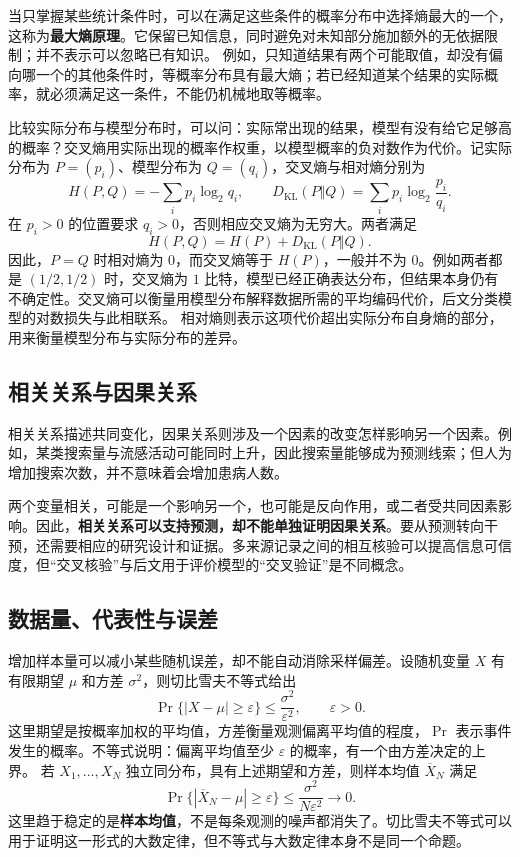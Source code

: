 \documentclass[UTF8,fontset=fandol,a4paper,12pt]{ctexart}
\theoremstyle{definition}
\begin{document}
当只掌握某些统计条件时，可以在满足这些条件的概率分布中选择熵最大的一个，这称为\textbf{最大熵原理}。它保留已知信息，同时避免对未知部分施加额外的无依据限制；并不表示可以忽略已有知识。
例如，只知道结果有两个可能取值，却没有偏向哪一个的其他条件时，等概率分布具有最大熵；若已经知道某个结果的实际概率，就必须满足这一条件，不能仍机械地取等概率。

比较实际分布与模型分布时，可以问：实际常出现的结果，模型有没有给它足够高的概率？交叉熵用实际出现的概率作权重，以模型概率的负对数作为代价。记实际分布为 $P=(p_i)$、模型分布为 $Q=(q_i)$，交叉熵与相对熵分别为
\[
 H(P,Q)=-\sum_i p_i\log_2 q_i,\qquad
 D_{\mathrm{KL}}(P\Vert Q)=\sum_i p_i\log_2\frac{p_i}{q_i}.
\]
在 $p_i>0$ 的位置要求 $q_i>0$，否则相应交叉熵为无穷大。两者满足
\[
 \boxed{H(P,Q)=H(P)+D_{\mathrm{KL}}(P\Vert Q).}
\]
因此，$P=Q$ 时相对熵为 $0$，而交叉熵等于 $H(P)$，一般并不为 $0$。例如两者都是 $(1/2,1/2)$ 时，交叉熵为 $1$ 比特，模型已经正确表达分布，但结果本身仍有不确定性。交叉熵可以衡量用模型分布解释数据所需的平均编码代价，后文分类模型的对数损失与此相联系。
相对熵则表示这项代价超出实际分布自身熵的部分，用来衡量模型分布与实际分布的差异。

\subsection{相关关系与因果关系}
相关关系描述共同变化，因果关系则涉及一个因素的改变怎样影响另一个因素。例如，某类搜索量与流感活动可能同时上升，因此搜索量能够成为预测线索；但人为增加搜索次数，并不意味着会增加患病人数。

两个变量相关，可能是一个影响另一个，也可能是反向作用，或二者受共同因素影响。因此，\textbf{相关关系可以支持预测，却不能单独证明因果关系}。要从预测转向干预，还需要相应的研究设计和证据。多来源记录之间的相互核验可以提高信息可信度，但“交叉核验”与后文用于评价模型的“交叉验证”是不同概念。

\subsection{数据量、代表性与误差}
增加样本量可以减小某些随机误差，却不能自动消除采样偏差。设随机变量 $X$ 有有限期望 $\mu$ 和方差 $\sigma^2$，则切比雪夫不等式给出
\[
 \Pr\{|X-\mu|\ge\varepsilon\}\le\frac{\sigma^2}{\varepsilon^2},
 \qquad\varepsilon>0.
\]
这里期望是按概率加权的平均值，方差衡量观测偏离平均值的程度，$\Pr$ 表示事件发生的概率。不等式说明：偏离平均值至少 $\varepsilon$ 的概率，有一个由方差决定的上界。
若 $X_1,\ldots,X_N$ 独立同分布，具有上述期望和方差，则样本均值 $\overline X_N$ 满足
\[
 \Pr\{|\overline X_N-\mu|\ge\varepsilon\}
 \le\frac{\sigma^2}{N\varepsilon^2}\longrightarrow0.
\]
这里趋于稳定的是\textbf{样本均值}，不是每条观测的噪声都消失了。切比雪夫不等式可以用于证明这一形式的大数定律，但不等式与大数定律本身不是同一个命题。
\end{document}
